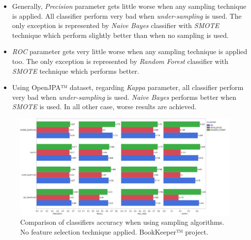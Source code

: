 \documentclass[sigconf]{acmart}
\begin{document}
\begin{itemize}
\begin{itemize}
\item Generally, \textit{Precision} parameter gets little worse when any sampling technique is applied. All classifier perform very bad when \textit{under-sampling} is used. The only exception is represented by \textit{Naive Bayes} classifier with \textit{SMOTE} technique which perform slightly better than when no sampling is used.

\item \textit{ROC} parameter gets very little worse when any sampling technique is applied too. The only exception is represented by \textit{Random Forest} classifier with \textit{SMOTE} technique which performs better.

\item Using OpenJPA™ dataset, regarding \textit{Kappa} parameter, all classifier perform very bad when \textit{under-sampling} is used. \textit{Naive Bayes} performs better when \textit{SMOTE} is used. In all other case, worse results are achieved.

\end{itemize}
\end{itemize}

\begin{figure}[h!]
  \centering
  \includegraphics[width=\textwidth]{./BOOKKEEPER/Sampling.png}
  \caption{Comparison of classifiers accuracy when using sampling algorithms. No feature selection technique applied. \newline BookKeeper™ project. \newline}
  \label{BOOKKEEPER-Sampling}
\end{figure}
\end{document}
